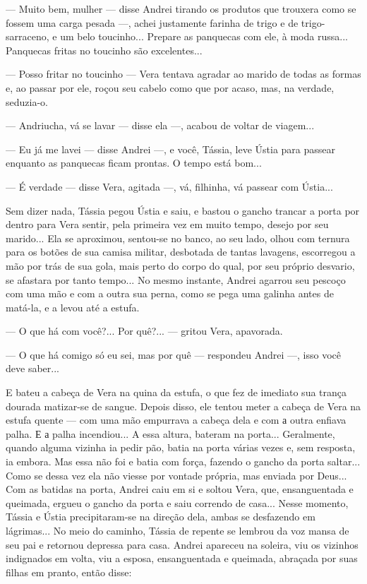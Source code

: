 --- Muito bem, mulher --- disse Andrei tirando os produtos que trouxera
como se fossem uma carga pesada ---, achei justamente farinha de trigo e
de trigo-sarraceno, e um belo toucinho... Prepare as panquecas com ele,
à moda russa... Panquecas fritas no toucinho são excelentes...

--- Posso fritar no toucinho --- Vera tentava agradar ao marido de todas
as formas e, ao passar por ele, roçou seu cabelo como que por acaso,
mas, na verdade, seduzia-o.

--- Andriucha, vá se lavar --- disse ela ---, acabou de voltar de
viagem...

--- Eu já me lavei --- disse Andrei ---, e você, Tássia, leve Ústia para
passear enquanto as panquecas ficam prontas. O tempo está bom...

--- É verdade --- disse Vera, agitada ---, vá, filhinha, vá passear com
Ústia...

Sem dizer nada, Tássia pegou Ústia e saiu, e bastou o gancho trancar a
porta por dentro para Vera sentir, pela primeira vez em muito tempo,
desejo por seu marido... Ela se aproximou, sentou-se no banco, ao seu
lado, olhou com ternura para os botões de sua camisa militar, desbotada
de tantas lavagens, escorregou a mão por trás de sua gola, mais perto do
corpo do qual, por seu próprio desvario, se afastara por tanto tempo...
No mesmo instante, Andrei agarrou seu pescoço com uma mão e com a outra
sua perna, como se pega uma galinha antes de matá-la, e a levou até a
estufa.

--- O que há com você?... Por quê?... --- gritou Vera, apavorada.

--- O que há comigo só eu sei, mas por quê --- respondeu Andrei ---,
isso você deve saber...

E bateu a cabeça de Vera na quina da estufa, o que fez de imediato sua
trança dourada matizar-se de sangue. Depois disso, ele tentou meter a
cabeça de Vera na estufa quente --- com uma mão empurrava a cabeça dela
e com а outra enfiava palha. Е а palha incendiou... A essa altura,
bateram na porta... Geralmente, quando alguma vizinha ia pedir pão,
batia na porta várias vezes e, sem resposta, ia embora. Mas essa não foi
e batia com força, fazendo o gancho da porta saltar... Como se dessa vez
ela não viesse por vontade própria, mas enviada por Deus... Com as
batidas na porta, Andrei caiu em si e soltou Vera, que, ensanguentada e
queimada, ergueu o gancho da porta e saiu correndo de casa... Nesse
momento, Tássia e Ústia precipitaram-se na direção dela, ambas se
desfazendo em lágrimas... No meio do caminho, Tássia de repente se
lembrou da voz mansa de seu pai e retornou depressa para casa. Andrei
apareceu na soleira, viu os vizinhos indignados em volta, viu a esposa,
ensanguentada e queimada, abraçada por suas filhas em pranto, então
disse:

